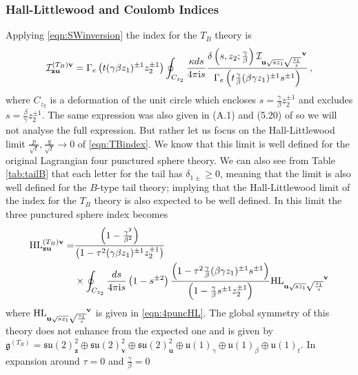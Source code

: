 \documentclass[main.tex]{subfiles}
\begin{document}
\subsubsection{Hall-Littlewood and Coulomb Indices}
Applying \eqref{eqn:SWinversion} the index for the $T_B$ theory is
\begin{equation}\label{eqn:TBindex}
 \mathcal{I}  ^{(T_B)\mathbf{v}}_{\mathbf{z}\mathbf{u}}=\Gamma_e\left(t(\gamma\beta z_1)^{\pm1}z_2^{\pm1}\right)\oint_{C_{z_2}}\frac{\kappa ds}{4\pi\iu s}\frac{\delta\left(s,z_2;\frac{\gamma}{\beta}\right) \mathcal{I}  \indices{_{\mathbf{u}\sqrt{sz_1}\sqrt{\frac{z_1}{s}}}^{\mathbf{v}}}}{\Gamma_e\left(t\frac{\gamma}{\beta}(\beta\gamma z_1)^{\pm1}s^{\pm1}\right)}\,,
\end{equation}
where $C_{z_2}$ is a deformation of the unit circle which encloses $s=\frac{\gamma}{\beta}z_2^{\pm1}$ and excludes $s=\frac{\beta}{\gamma}z_2^{\pm1}$.
The same expression was also given in (A.1) and (5.20) of \cite{Razamat:2016dpl} so we will not analyse the full expression. But rather let us focus on the Hall-Littlewood limit $\frac{p}{\sqrt{t}},\frac{q}{\sqrt{t}}\to0$ of \eqref{eqn:TBindex}. We know that this limit is well defined for the original Lagrangian four punctured sphere theory. We can also see from Table \ref{tab:tailB} that each letter for the tail has $\delta_{1\pm}\geq0$, meaning that the limit is also well defined for the $B$-type tail theory; implying that the Hall-Littlewood limit of the index for the $T_B$ theory is also expected to be well defined. In this limit the three punctured sphere index becomes
\begin{equation}\label{eqn:HLTBindex}
\begin{aligned}
\HL^{(T_B)\mathbf{v}}_{\mathbf{z}\mathbf{u}}=&\frac{\left(1-\frac{\gamma^2}{\beta^2}\right)}{\left(1-\tau^2(\gamma\beta z_1)^{\pm1}z_2^{\pm1}\right)}\\&\times\oint_{C_{z_2}}\frac{ds}{4\pi\iu s}\left(1-s^{\pm2}\right)\frac{\left(1-\tau^2\frac{\gamma}{\beta}(\beta\gamma z_1)^{\pm1}s^{\pm1}\right)}{\left(1-\frac{\gamma}{\beta}s^{\pm1}z_2^{\pm1}\right)}\HL\indices{_{{\mathbf{u}}{\sqrt{sz_1}}{\sqrt{\frac{z_1}{s}}}}^{\mathbf{v}}}
\end{aligned}
\end{equation}
where $\HL\indices{_{{\mathbf{u}}{\sqrt{sz_1}}{\sqrt{\frac{z_1}{s}}}}^{\mathbf{v}}}$ is given in \eqref{eqn:4puncHL}. The global symmetry of this theory does not enhance from the expected one and is given by $\mathfrak{g}^{(T_B)}=\mathfrak{su}(2)_{\mathbf{z}}^2\oplus \mathfrak{su}(2)_{\mathbf{v}}^2\oplus \mathfrak{su}(2)_{\mathbf{u}}^2\oplus \mathfrak{u}(1)_{\gamma}\oplus \mathfrak{u}(1)_{\beta}\oplus \mathfrak{u}(1)_t$. In expansion around $\tau=0$ and $\frac{\gamma}{\beta}=0$
\end{document}

